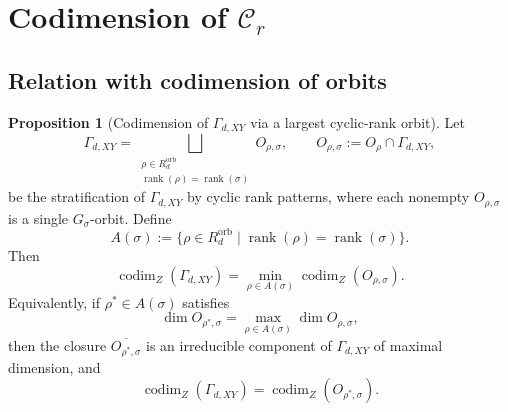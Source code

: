 \documentclass{article}
\newcommand{\rank}{\operatorname{rank}}
\newcommand{\codim}{\operatorname{codim}}
\theoremstyle{definition}
\newtheorem{proposition}[theorem]{Proposition}
\begin{document}
\section{Codimension of $\mathcal{C}_r$}
\subsection{Relation with codimension of orbits}
\begin{proposition}[Codimension of $\Gamma_{d,XY}$ via a largest cyclic-rank orbit]
Let
\[
\Gamma_{d,XY}
=
\bigsqcup_{\substack{\rho \in R_d^{\mathrm{orb}}\\ \rank(\rho)=\rank(\sigma)}}
O_{\rho,\sigma},
\qquad
O_{\rho,\sigma}:=O_\rho \cap \Gamma_{d,XY},
\]
be the stratification of $\Gamma_{d,XY}$ by cyclic rank patterns, where each nonempty
$O_{\rho,\sigma}$ is a single $G_\sigma$-orbit. Define
\[
A(\sigma)
:=
\bigl\{
\rho \in R_d^{\mathrm{orb}}
\;\big|\;
\rank(\rho)=\rank(\sigma)
\bigr\}.
\]
Then
\[
\codim_Z(\Gamma_{d,XY})
=
\min_{\rho \in A(\sigma)} \codim_Z(O_{\rho,\sigma}).
\]
Equivalently, if $\rho^\ast \in A(\sigma)$ satisfies
\[
\dim O_{\rho^\ast,\sigma}
=
\max_{\rho \in A(\sigma)} \dim O_{\rho,\sigma},
\]
then the closure $\overline{O_{\rho^\ast,\sigma}}$ is an irreducible component of
$\Gamma_{d,XY}$ of maximal dimension, and
\[
\codim_Z(\Gamma_{d,XY})
=
\codim_Z(O_{\rho^\ast,\sigma}).
\]
\end{proposition}
\end{document}
